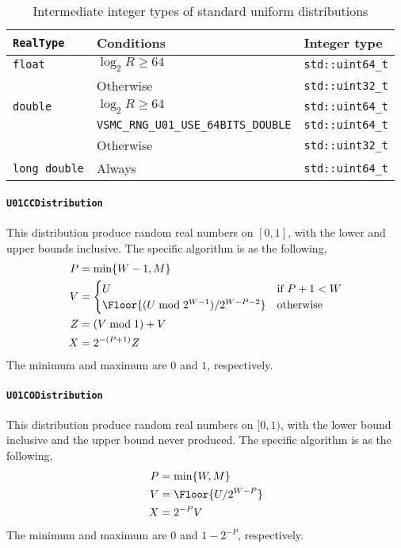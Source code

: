 \begin{table}
  \begin{tabularx}{\textwidth}{XlX}
    \toprule
    \verb|RealType| & Conditions & Integer type \\
    \midrule
    \verb|float| & $\log_2 R \ge 64$ & \verb|std::uint64_t| \\
                 & Otherwise         & \verb|std::uint32_t| \\
    \verb|double| & $\log_2 R \ge 64$ & \verb|std::uint64_t| \\
    & \verb|VSMC_RNG_U01_USE_64BITS_DOUBLE| & \verb|std::uint64_t| \\
    & Otherwise & \verb|std::uint32_t| \\
    \verb|long double| & Always & \verb|std::uint64_t| \\
    \bottomrule
  \end{tabularx}
  \caption{Intermediate integer types of standard uniform distributions}
  \label{tab:Intermediate integer types of standard uniform distributions}
\end{table}

\paragraph{\texttt{U01CCDistribution}}

This distribution produce random real numbers on $[0, 1]$, with the lower and
upper bounds inclusive. The specific algorithm is as the following,
\begin{align*}
  P &= \min\{W - 1, M\} \\
  V &= \begin{cases}
    U &\text{if } P + 1 < W \\
    \Floor{(U \bmod 2^{W - 1}) / 2^{W - P -2}} &\text{otherwise}
  \end{cases} \\
  Z &= (V \bmod 1) + V \\
  X &= 2^{-(P + 1)} Z
\end{align*}
The minimum and maximum are $0$ and $1$, respectively.

\paragraph{\texttt{U01CODistribution}}

This distribution produce random real numbers on $[0, 1)$, with the lower bound
inclusive and the upper bound never produced. The specific algorithm is as the
following,
\begin{align*}
  P &= \min\{W, M\} \\
  V &= \Floor{U / 2^{W - P}} \\
  X &= 2^{-P} V
\end{align*}
The minimum and maximum are $0$ and $1 - 2^{-P}$, respectively.

